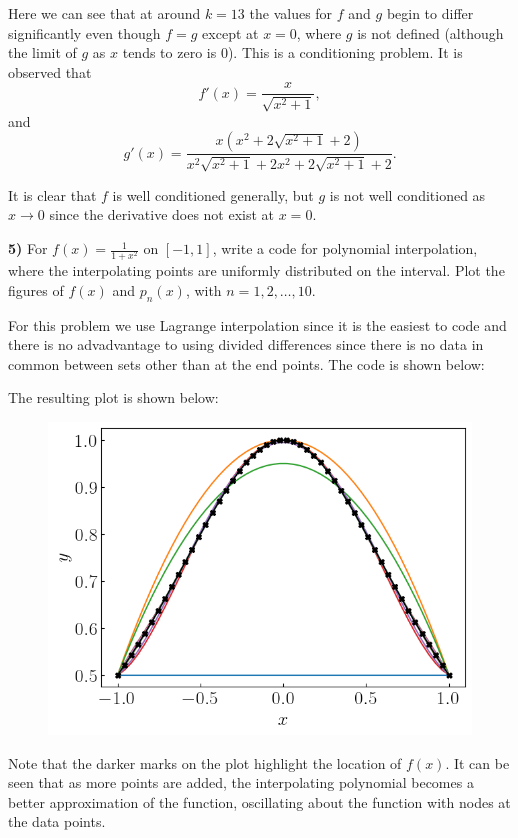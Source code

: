 \documentclass[12pt,a4paper]{article}
\newcommand{\prob}[2]{\textbf{#1)} #2}
\begin{document}

Here we can see that at around $k = 13$ the values for $f$ and $g$ begin to differ significantly even though $f = g$ except at $x = 0$, where $g$ is not defined (although the limit of $g$ as $x$ tends to zero is 0).
This is a conditioning problem. 
It is observed that 
\[
f'\left( x \right) = \frac{x}{\sqrt{x^{2} + 1}}
,\]
and
\[
g'\left( x \right) = \frac{x \left(x^{2} + 2 \sqrt{x^{2} + 1} + 2\right)}{x^{2} \sqrt{x^{2} + 1} + 2 x^{2} + 2 \sqrt{x^{2} + 1} + 2}
.\]

It is clear that $f$ is well conditioned generally, but $g$ is not well conditioned as $x \rightarrow 0$ since the derivative does not exist at $x=0$.

\prob{5}{For $f\left( x \right) = \frac{1}{1+x^2}$ on $[-1,1]$, write a code for polynomial interpolation, where the interpolating points are uniformly distributed on the interval. Plot the figures of $f(x)$ and $p_{n}(x)$, with $n = 1,2,\ldots,10$.}

For this problem we use Lagrange interpolation since it is the easiest to code and there is no advadvantage to using divided differences since there is no data in common between sets other than at the end points.
The code is shown below:


The resulting plot is shown below:
\begin{figure}[H]
    \begin{center}
        \includegraphics[scale=0.75]{./fig1.png}
    \end{center} 
\end{figure}

Note that the darker marks on the plot highlight the location of $f(x)$.
It can be seen that as more points are added, the interpolating polynomial becomes a better approximation of the function, oscillating about the function with nodes at the data points.
\end{document}
